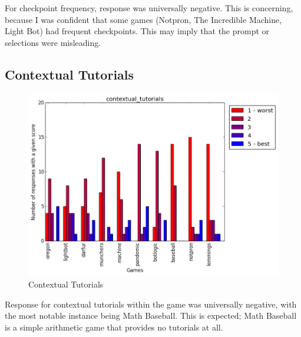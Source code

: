 				For checkpoint frequency, response was universally negative. This is concerning, because I was confident that some games (Notpron, The Incredible Machine, Light Bot) had frequent checkpoints. This may imply that the prompt or selections were misleading.

			\subsection{Contextual Tutorials}
				\begin{figure}[] 
				\centering 
				\includegraphics[width=\textwidth, height=.4\textheight, keepaspectratio=true]{contextual_tutorials_scores.png} 
				\caption{Contextual Tutorials}
				\end{figure}

				Response for contextual tutorials within the game was universally negative, with the most notable instance being Math Baseball. This is expected; Math Baseball is a simple arithmetic game that provides no tutorials at all.


